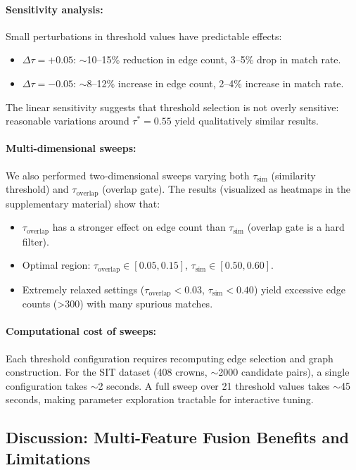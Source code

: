\paragraph{Sensitivity analysis:}
Small perturbations in threshold values have predictable effects:
\begin{itemize}
    \item $\Delta \tau = +0.05$: $\sim$10--15\% reduction in edge count, 3--5\% drop in match rate.
    \item $\Delta \tau = -0.05$: $\sim$8--12\% increase in edge count, 2--4\% increase in match rate.
\end{itemize}
The linear sensitivity suggests that threshold selection is not overly sensitive: reasonable variations around $\tau^* = 0.55$ yield qualitatively similar results.

\paragraph{Multi-dimensional sweeps:}
We also performed two-dimensional sweeps varying both $\tau_{\text{sim}}$ (similarity threshold) and $\tau_{\text{overlap}}$ (overlap gate). The results (visualized as heatmaps in the supplementary material) show that:
\begin{itemize}
    \item $\tau_{\text{overlap}}$ has a stronger effect on edge count than $\tau_{\text{sim}}$ (overlap gate is a hard filter).
    \item Optimal region: $\tau_{\text{overlap}} \in [0.05, 0.15]$, $\tau_{\text{sim}} \in [0.50, 0.60]$.
    \item Extremely relaxed settings ($\tau_{\text{overlap}} < 0.03$, $\tau_{\text{sim}} < 0.40$) yield excessive edge counts (>300) with many spurious matches.
\end{itemize}

\paragraph{Computational cost of sweeps:}
Each threshold configuration requires recomputing edge selection and graph construction. For the SIT dataset (408 crowns, $\sim$2000 candidate pairs), a single configuration takes $\sim$2 seconds. A full sweep over 21 threshold values takes $\sim$45 seconds, making parameter exploration tractable for interactive tuning.

\subsection{Discussion: Multi-Feature Fusion Benefits and Limitations}

